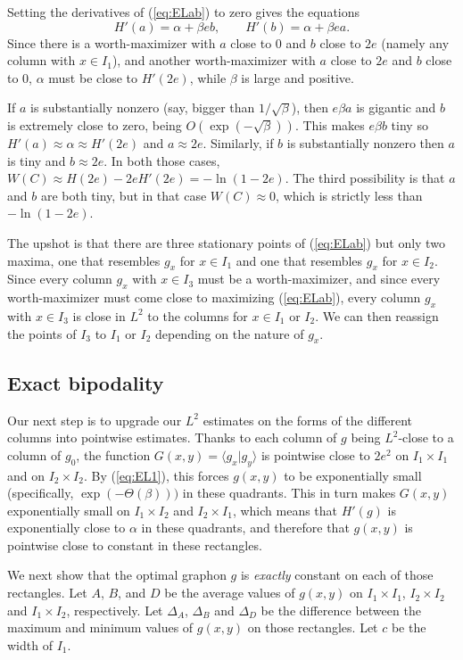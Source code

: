 \documentclass[12pt]{amsart}
\newcommand\be{\begin{equation}}
\newcommand\ee{\end{equation}}
\newcommand{\Value}{worth}
\begin{document}
{Setting the derivatives of (\ref{eq:ELab}) to zero gives the equations
\be H'(a) = \alpha + \beta eb, \qquad H'(b) = \alpha + \beta ea. \ee
Since there is a \Value-maximizer with $a$ close to 0 and $b$ close 
to $2e$ (namely any column with $x \in I_1$), and another 
\Value-maximizer with $a$ close to $2e$ and $b$ close to 0, $\alpha$
must be close to $H'(2e)$, while $\beta$ is large and positive. 

If $a$ is substantially nonzero (say, bigger than $1/\sqrt{\beta}$),
then $e\beta a$ is gigantic and $b$ is extremely close to zero, being 
$O(\exp(-\sqrt{\beta}))$. This makes  
$e\beta b$ tiny so $H'(a) \approx \alpha \approx H'(2e)$ and 
$a \approx 2e$. Similarly, if 
$b$ is substantially nonzero then $a$ is tiny and $b \approx 2e$.
In both those cases, $W(C) \approx H(2e) - 2eH'(2e) = - 
\ln(1-2e)$. The third possibility is that $a$ and $b$ are both 
tiny, but in that case $W(C) \approx 0$, which is strictly less than $-\ln(1-2e)$. 

The upshot is that there are three stationary points of 
(\ref{eq:ELab}) but only two maxima, one that resembles $g_x$ for 
$x \in I_1$ and one that resembles $g_x$ for $x \in I_2$. Since every 
column $g_x$ with $x \in I_3$ must be a \Value-maximizer, and 
since every \Value-maximizer must come close to maximizing (\ref{eq:ELab}), every column $g_x$ with $x \in I_3$ is close in $L^2$ to the columns 
for $x\in I_1$ or $I_2$. We can then 
reassign the points of $I_3$ to $I_1$ or $I_2$ depending on the nature
of $g_x$.


\subsection{Exact bipodality}

Our next step is to upgrade our $L^2$ estimates on the forms of the different 
columns into pointwise estimates. Thanks to each column of $g$ being
$L^2$-close to a column of $g_0$, the function 
$G(x,y) = \langle g_x | g_y \rangle$ is pointwise close to $2e^2$ on 
$I_1 \times I_1$ and on $I_2 \times 
I_2$. By (\ref{eq:EL1}), this forces $g(x,y)$ to be exponentially 
small (specifically, $\exp(-\Theta(\beta)))$ in 
these quadrants. This in turn makes $G(x,y)$ exponentially small on
$I_1 \times I_2$ and $I_2 \times I_1$, which means that $H'(g)$ 
is exponentially close to $\alpha$ in these quadrants, and 
therefore that $g(x,y)$ is pointwise close to constant in these
rectangles. 

We next show that the optimal graphon $g$ 
is {\em exactly} constant on each of those rectangles. 
Let $A$, $B$, and $D$ be the average values of $g(x,y)$ on $I_1 \times I_1$, $I_2 \times I_2$ and 
$I_1 \times I_2$, respectively. Let $\Delta_A$, $\Delta_B$ and $\Delta_D$ be the difference between 
the maximum and minimum values of $g(x,y)$ on those rectangles. Let $c$ be the width of $I_1$.

}
\end{document}
